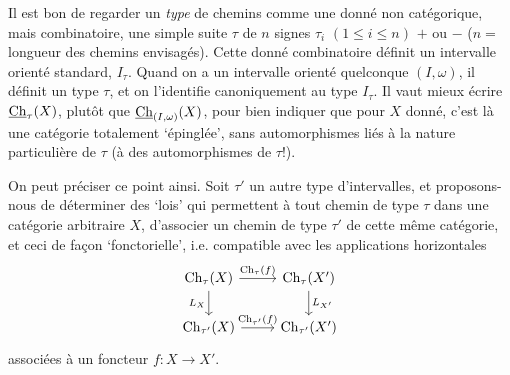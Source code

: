 

Il est bon de regarder un \textit{type} de chemins comme une donné non catégorique, mais combinatoire, une simple suite $\tau$ de $n$ signes $\tau_i$ $(1 \leq i \leq n)$ $+$ ou $-$ ($n =$ longueur des chemins envisagés). Cette donné combinatoire définit un intervalle orienté standard, $I_\tau$. Quand on a un intervalle orienté quelconque $(I,\omega)$, il définit un type $\tau$, et on l'identifie canoniquement au type $I_\tau$. Il vaut mieux écrire $\underline{\mathrm{Ch}}_\tau(X)$, plutôt que $\underline{\mathrm{Ch}}_{(I,\omega)}(X)$, pour bien indiquer que pour $X$ donné, c'est là une catégorie totalement `épinglée', sans automorphismes liés à la nature particulière de $\tau$ (à des automorphismes de $\tau$!). %

On peut préciser ce point ainsi. Soit $\tau'$ un autre type d'intervalles, et proposons-nous de déterminer des `lois' qui permettent à tout chemin de type $\tau$ dans une catégorie arbitraire $X$, d'associer un chemin de type $\tau'$ de cette même catégorie, et ceci de façon `fonctorielle', i.e. compatible avec les applications horizontales
\[
\begin{tikzcd}
\mathrm{Ch}_\tau(X) \arrow[r, "\mathrm{Ch}_\tau(f)"] \arrow[d, "L_X"'] & \mathrm{Ch}_\tau(X') \arrow[d, "L_{X'}"] \\
\mathrm{Ch}_{\tau'}(X) \arrow[r, "\mathrm{Ch}_{\tau'}(f)"] & \mathrm{Ch}_{\tau'}(X')
\end{tikzcd}
\]
associées à un foncteur $f : X \longrightarrow X'$.


